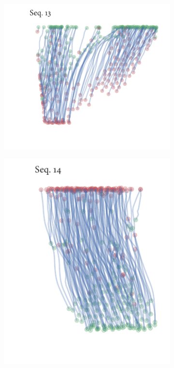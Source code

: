\begin{figure}[h]
	\begin{subfigure}[t]{0.5\textwidth}
		\centering
		\includegraphics{sequence13.pdf}
	\end{subfigure}%
	\begin{subfigure}[t]{0.5\textwidth}
		\centering
		\includegraphics{sequence14.pdf}
	\end{subfigure}
	\begin{subfigure}[t]{0.5\textwidth}
		\centering

\end{subfigure}
\end{figure}
